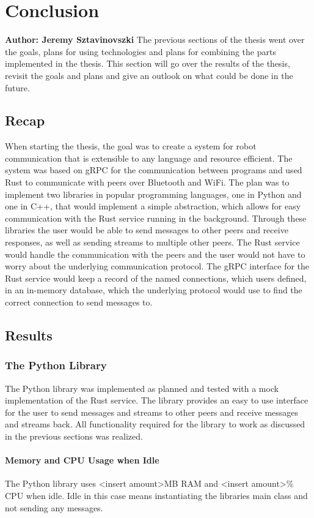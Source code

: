 \chapter{Conclusion}

\textbf{Author: Jeremy Sztavinovszki} 
The previous sections of the thesis went over the goals, plans for using technologies and plans for combining the parts implemented in the thesis.
This section will go over the results of the thesis, revisit the goals and plans and give an outlook on what could be done in the future.

\section{Recap}
When starting the thesis, the goal was to create a system for robot communication that is extensible to any language and resource efficient. The system was based on gRPC for the communication between programs
and used Rust to communicate with peers over Bluetooth and WiFi. The plan was to implement two libraries in popular programming languages, one in Python and one in C++, that would implement a simple abstraction,
which allows for easy communication with the Rust service running in the background. Through these libraries the user would be able to send messages to other peers and receive responses, as well as sending streams to multiple
other peers. The Rust service would handle the communication with the peers and the user would not have to worry about the underlying communication protocol. The gRPC interface for the Rust service would keep a record of
the named connections, which users defined, in an in-memory database, which the underlying protocol would use to find the correct connection to send messages to.

\section{Results}
\subsection{The Python Library}
The Python library was implemented as planned and tested with a mock implementation of the Rust service. The library provides an easy to use interface for the user to send messages and streams to other peers and receive messages and streams back.
All functionality required for the library to work as discussed in the previous sections was realized.

\subsubsection{Memory and CPU Usage when Idle}
The Python library uses <insert amount>MB RAM and <insert amount>\% CPU when idle. Idle in this case means instantiating the libraries main class and not sending any messages.

